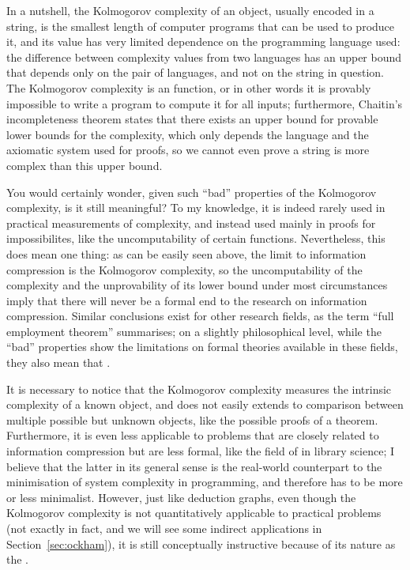 In a nutshell, the Kolmogorov complexity of an object, usually encoded in a
string, is the smallest length of computer programs that can be used to produce
it, and its value has very limited dependence on the programming language used:
the difference between complexity values from two languages has an upper bound
that depends only on the pair of languages, and not on the string in question.
The Kolmogorov complexity is an  function, or in other
words it is provably impossible to write a program to compute it for all inputs;
furthermore, Chaitin's incompleteness theorem states that there exists an upper
bound for provable lower bounds for the complexity, which only depends the
language and the axiomatic system used for proofs, so we cannot even prove a
string is more complex than this upper bound.

You would certainly wonder, given such ``bad'' properties of the Kolmogorov
complexity, is it still meaningful?  To my knowledge, it is indeed rarely used
in practical measurements of complexity, and instead used mainly in proofs for
impossibilites, like the uncomputability of certain functions.  Nevertheless,
this does mean one thing: as can be easily seen above, the limit to information
compression is the Kolmogorov complexity, so the uncomputability of the
complexity and the unprovability of its lower bound under most circumstances
imply that there will never be a formal end to the research on information
compression.  Similar conclusions exist for other research fields, as
the term ``full employment theorem'' summarises;
on a slightly philosophical level, while the ``bad'' properties show the
limitations on formal theories available in these fields, they also mean that
.

It is necessary to notice that the Kolmogorov complexity measures the intrinsic
complexity of a known object, and does not easily extends to comparison between
multiple possible but unknown objects, like the possible proofs of a theorem.
Furthermore, it is even less applicable to problems that are closely related to
information compression but are less formal, like the field of  in library science; I believe that the latter in its general
sense is the real-world counterpart to the minimisation of system complexity
in programming, and therefore has to be more or less minimalist.  However,
just like deduction graphs, even though the Kolmogorov complexity is not
quantitatively applicable to practical problems (not exactly in fact,
and we will see some indirect applications in Section~\ref{sec:ockham}),
it is still conceptually instructive because of its nature
as the .

